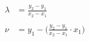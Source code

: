 
\begin{align*}
\lambda &= \frac{y_2 - y_1}{x_2 - x_1} \\
\\
\nu &= y_1 - \biggr( \frac{y_2 - y_1}{x_2 - x_1} \cdot x_1 \biggl)\\
\end{align*}
